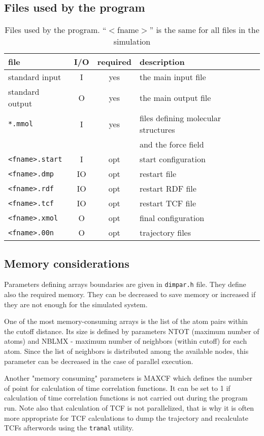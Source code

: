 \documentclass{article}
\begin{document}
\subsection{Files used by the program}

\begin{table}[h!]
\caption{Files used by the program. ``$<$fname$>$'' is the same for all files
in the simulation}
\begin{tabular}{|lccl|}
\hline
file   &  I/O  &  required & description \\
\hline
standard input &  I  &  yes &  the main input file\\
standard output & O  &  yes &  the main output file\\
\verb|*.mmol|   & I  &  yes &  files defining molecular structures \\
               &     &      &  and the force field \\
\verb|<fname>.start| & I & opt & start configuration \\
\verb|<fname>.dmp| & IO & opt & restart file \\
\verb|<fname>.rdf| & IO & opt & restart RDF file \\
\verb|<fname>.tcf| & IO & opt & restart TCF file \\
\verb|<fname>.xmol| & O & opt & final configuration \\
\verb|<fname>.00n| &  O & opt & trajectory files \\
\hline
\end{tabular}
\end{table}

\subsection{Memory considerations}

Parameters defining arrays boundaries are given in \verb|dimpar.h| file.
They define also the required memory.  They can be decreased to 
save memory or increased if they are not enough for the simulated system.

One of the most memory-consuming arrays is the list of the atom pairs
within the cutoff distance. Its size is defined by parameters NTOT (maximum 
number of atoms) and NBLMX - maximum number of neighbors (within cutoff) 
for each atom. Since the list of neighbors is distributed among the available 
nodes, this parameter can be decreased in the case of parallel execution. 

Another "memory consuming" parameters is MAXCF which defines the number
of point for calculation of time correlation functions.  It can be set
to 1 if calculation of time correlation functions is not carried out 
during the program run. Note also that calculation of TCF is not parallelized,
that is why it is often more appropriate for TCF calculations to dump
the trajectory and recalculate TCFs afterwords using the \verb|tranal| 
utility.
\end{document}

